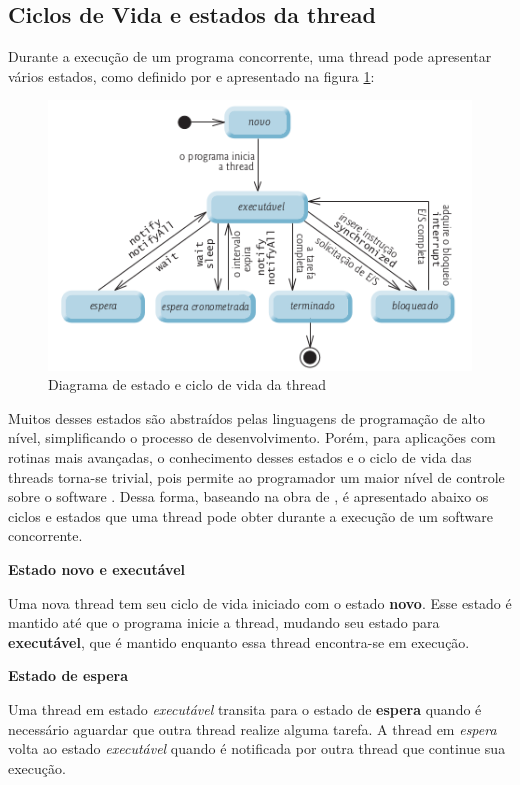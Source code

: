 \subsection{Ciclos de Vida e estados da thread}

Durante a execução de um programa concorrente, uma thread pode apresentar vários estados, como definido por  e apresentado na figura \ref{fig:ciclovidathread}:

\begin{figure}[H]
	\centering
	\includegraphics[width=0.8\linewidth]{imagens/cicloVidaThread}
	\caption[Estado e ciclo de vida da thread]{Diagrama de estado e ciclo de vida da thread \cite{deitel2016}}
	\label{fig:ciclovidathread}
\end{figure}

Muitos desses estados são abstraídos pelas linguagens de programação de alto nível, simplificando o processo de desenvolvimento. Porém, para aplicações com rotinas mais avançadas, o conhecimento desses estados e o ciclo de vida das threads torna-se trivial, pois permite ao programador um maior nível de controle sobre o software \cite{deitel2016}. Dessa forma, baseando na obra de , é apresentado abaixo os ciclos e estados que uma thread pode obter durante a execução de um software concorrente.

\textbf{Estado novo e executável}

Uma nova thread tem seu ciclo de vida iniciado com o estado \textbf{novo}. Esse estado é mantido até que o programa inicie a thread, mudando seu estado para \textbf{executável}, que é mantido enquanto essa thread encontra-se em execução.

\textbf{Estado de espera}

Uma thread em estado \textit{executável} transita para o estado de \textbf{espera} quando é necessário aguardar que outra thread realize alguma tarefa. A thread em \textit{espera} volta ao estado \textit{executável} quando é notificada por outra thread que continue sua execução.

